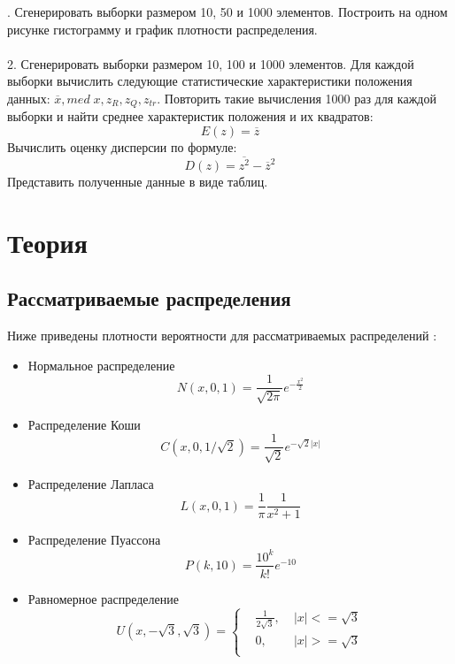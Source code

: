 \documentclass[12pt]{article}
\begin{document}
. Сгенерировать выборки размером 10, 50 и 1000 элементов.
Построить на одном рисунке гистограмму и график плотности распределения.\\
\phantom{0}\\
2. Сгенерировать выборки размером 10, 100 и 1000 элементов.
Для каждой выборки вычислить следующие статистические характеристики положения данных: $\overline{x}, med \; x, z_R, z_Q, z_{tr}$. Повторить такие
вычисления 1000 раз для каждой выборки и найти среднее характеристик положения и их квадратов:
\begin{equation}
    E(z) = \overline{z} \label{meanz}
\end{equation}
Вычислить оценку дисперсии по формуле:
\begin{equation}
    D(z) = \overline{z^2} - \overline{z}^2 \label{dispersion}
\end{equation}
Представить полученные данные в виде таблиц.

\newpage

\section{Теория}
\subsection{Рассматриваемые распределения}
Ниже приведены плотности вероятности для рассматриваемых распределений \cite{theory}:
\begin{itemize}
	\item Нормальное распределение
	\begin{equation}
		N(x, 0, 1) = \frac{1}{\sqrt{2\pi}}e^{-\frac{x^2}{2}}
	\end{equation}

	\item Распределение Коши
    \begin{equation}
        C(x, 0, 1/\sqrt{2}) =\frac{1}{\sqrt{2}} e^{-\sqrt{2}|x|}
    \end{equation}

	\item Распределение Лапласа
	\begin{equation}
		L(x, 0, 1) = \frac{1}{\pi}\frac{1}{x^2 + 1}
	\end{equation}

    \item Распределение Пуассона
    \begin{equation}
        P(k, 10) = \frac{10^k}{k!} e^{-10}
	\end{equation}
	
    \item Равномерное распределение
    \begin{equation}
		U(x, -\sqrt{3}, \sqrt{3}) = 
		\left\{
		\begin{aligned}
			& \frac{1}{2\sqrt{3}},& \; |x| <= \sqrt{3}\\
			& 0,                  & \; |x| >= \sqrt{3}\\
		\end{aligned}
		\right.
	\end{equation}
\end{itemize}
\end{document}
